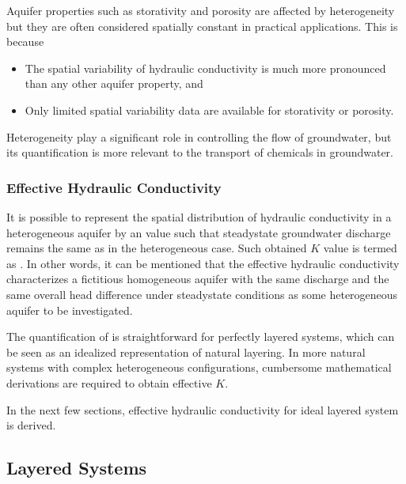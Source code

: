 \documentclass[letterpaper,10pt,english]{sphinxmanual}
\begin{document}
Aquifer properties such as storativity and porosity are affected by heterogeneity but they are often considered spatially constant in practical applications. This is because
\begin{itemize}
\item {} 
The spatial variability of hydraulic conductivity is much more pronounced than any other aquifer property, and

\item {} 
Only limited spatial variability data are available for storativity or porosity.

\end{itemize}

Heterogeneity play a significant role in controlling the flow of groundwater, but its quantification is more relevant to the transport of chemicals in groundwater.


\subsubsection{Effective Hydraulic Conductivity}
\label{\detokenize{contents/flow/lecture_05/15_het_iso:effective-hydraulic-conductivity}}
It is possible to represent the spatial distribution of
hydraulic conductivity in a heterogeneous aquifer by an 
value such that steady\sphinxhyphen{}state groundwater discharge remains the
same as in the heterogeneous case. Such obtained  \(K\) value is termed as . In other words, it can be mentioned that the effective hydraulic conductivity characterizes a
fictitious homogeneous aquifer with the same discharge and the
same overall head difference under steady\sphinxhyphen{}state conditions as some
heterogeneous aquifer to be investigated.

The quantification of  is straight\sphinxhyphen{}forward for perfectly layered systems, which can be seen as an idealized representation of natural layering. In more natural systems with complex heterogeneous configurations, cumbersome mathematical derivations are required to obtain effective \(K\).

In the next few sections, effective hydraulic conductivity for ideal layered system is derived.


\subsection{Layered Systems}
\label{\detokenize{contents/flow/lecture_05/15_het_iso:layered-systems}}
\end{document}

